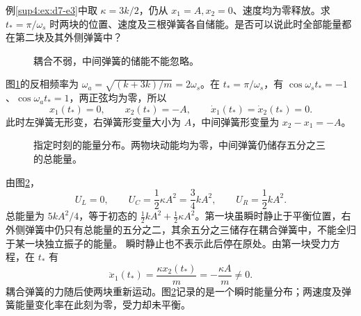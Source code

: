 \begin{exercise}[包络交接时能量在哪里]\label{sup4:problem-exercise-4}\label{sup4:ex:d7-h4}
例\ref{sup4:ex:d7-e3}中取 $\kappa=3k/2$，仍从 $x_1=A,x_2=0$、速度均为零释放。求 $t_* =\pi/\omega_s$ 时两块的位置、速度及三根弹簧各自储能。是否可以说此时全部能量都在第二块及其外侧弹簧中？
\end{exercise}
\begin{figure}[H]\centering
{}
\caption{耦合不弱，中间弹簧的储能不能忽略。}\label{sup4:fig:d7-h4-q}
\end{figure}
\begin{solution}
图\ref{sup4:fig:d7-h4-q}的反相频率为 $\omega_a=\sqrt{(k+3k)/m}=2\omega_s$。在 $t_* =\pi/\omega_s$，有 $\cos\omega_st_*=-1$、$\cos\omega_at_*=1$，两正弦均为零，所以
\[
x_1(t_*)=0,\qquad x_2(t_*)=-A,\qquad
\dot x_1(t_*)=\dot x_2(t_*)=0.
\]
此时左弹簧无形变，右弹簧形变量大小为 $A$，中间弹簧形变量为 $x_2-x_1=-A$。
\begin{figure}[H]\centering
{}
\caption{指定时刻的能量分布。两物块动能均为零，中间弹簧仍储存五分之三的总能量。}\label{sup4:fig:d7-h4-s}
\end{figure}
由图\ref{sup4:fig:d7-h4-s}，
\[
U_L=0,\qquad U_C=\frac12\kappa A^2=\frac34kA^2,\qquad U_R=\frac12kA^2.
\]
总能量为 $5kA^2/4$，等于初态的 $\frac12kA^2+\frac12\kappa A^2$。第一块虽瞬时静止于平衡位置，右外侧弹簧中仍只有总能量的五分之二，其余五分之三储存在耦合弹簧中，不能全归于某一块独立振子的能量。
瞬时静止也不表示此后停在原处。由第一块受力方程，在 $t_*$ 有
\[
\ddot x_1(t_*)=\frac{\kappa x_2(t_*)}{m}=-\frac{\kappa A}{m}\ne0.
\]
耦合弹簧的力随后使两块重新运动。图\ref{sup4:fig:d7-h4-s}记录的是一个瞬时能量分布；两速度及弹簧能量变化率在此刻为零，受力却未平衡。
\end{solution}


